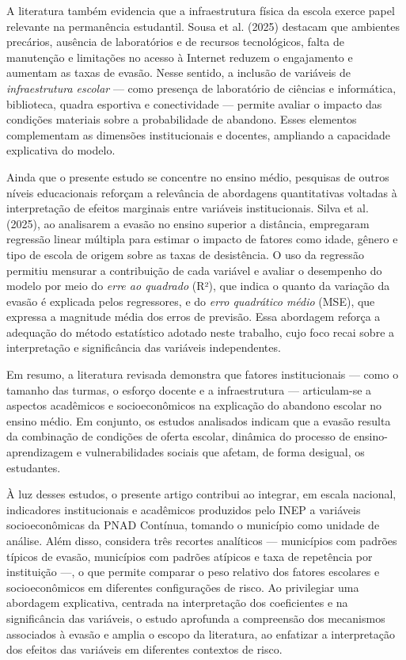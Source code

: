 \documentclass[english, spanish, brazilian]{RBIEarticle} %
\begin{document}
A literatura também evidencia que a infraestrutura física da escola exerce papel relevante na permanência estudantil. Sousa et al. (2025) destacam que ambientes precários, ausência de laboratórios e de recursos tecnológicos, falta de manutenção e limitações no acesso à Internet reduzem o engajamento e aumentam as taxas de evasão. Nesse sentido, a inclusão de variáveis de \textit{infraestrutura escolar} — como presença de laboratório de ciências e informática, biblioteca, quadra esportiva e conectividade — permite avaliar o impacto das condições materiais sobre a probabilidade de abandono. Esses elementos complementam as dimensões institucionais e docentes, ampliando a capacidade explicativa do modelo.

Ainda que o presente estudo se concentre no ensino médio, pesquisas de outros níveis educacionais reforçam a relevância de abordagens quantitativas voltadas à interpretação de efeitos marginais entre variáveis institucionais. Silva et al. (2025), ao analisarem a evasão no ensino superior a distância, empregaram regressão linear múltipla para estimar o impacto de fatores como idade, gênero e tipo de escola de origem sobre as taxas de desistência. O uso da regressão permitiu mensurar a contribuição de cada variável e avaliar o desempenho do modelo por meio do \textit{erre ao quadrado} (R²), que indica o quanto da variação da evasão é explicada pelos regressores, e do \textit{erro quadrático médio} (MSE), que expressa a magnitude média dos erros de previsão. Essa abordagem reforça a adequação do método estatístico adotado neste trabalho, cujo foco recai sobre a interpretação e significância das variáveis independentes.

Em resumo, a literatura revisada demonstra que fatores institucionais — como o tamanho das turmas, o esforço docente e a infraestrutura — articulam-se a aspectos acadêmicos e socioeconômicos na explicação do abandono escolar no ensino médio. Em conjunto, os estudos analisados indicam que a evasão resulta da combinação de condições de oferta escolar, dinâmica do processo de ensino-aprendizagem e vulnerabilidades sociais que afetam, de forma desigual, os estudantes.

À luz desses estudos, o presente artigo contribui ao integrar, em escala nacional, indicadores institucionais e acadêmicos produzidos pelo INEP a variáveis socioeconômicas da PNAD Contínua, tomando o município como unidade de análise. Além disso, considera três recortes analíticos — municípios com padrões típicos de evasão, municípios com padrões atípicos e taxa de repetência por instituição —, o que permite comparar o peso relativo dos fatores escolares e socioeconômicos em diferentes configurações de risco. Ao privilegiar uma abordagem explicativa, centrada na interpretação dos coeficientes e na significância das variáveis, o estudo aprofunda a compreensão dos mecanismos associados à evasão e amplia o escopo da literatura, ao enfatizar a interpretação dos efeitos das variáveis em diferentes contextos de risco.
\end{document}
